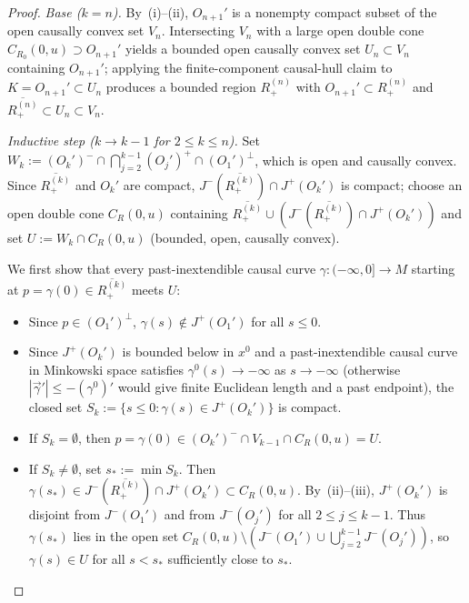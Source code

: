 \documentclass[11pt,a4paper]{article}
\theoremstyle{definition}
\theoremstyle{remark}
\begin{document}
\begin{proof}
\emph{Base ($k=n$).} By~(i)--(ii), $O_{n+1}'$ is a nonempty compact subset of the open causally convex set $V_n$. Intersecting $V_n$ with a large open double cone $C_{R_0}(0,u)\supset O_{n+1}'$ yields a bounded open causally convex set $U_n\subset V_n$ containing $O_{n+1}'$; applying the finite-component causal-hull claim to $K=O_{n+1}'\subset U_n$ produces a bounded region $R_+^{(n)}$ with $O_{n+1}'\subset R_+^{(n)}$ and $\overline{R_+^{(n)}}\subset U_n\subset V_n$.

\emph{Inductive step ($k\to k-1$ for $2\le k\le n$).} Set $W_k := (O_k')^-\cap \bigcap_{j=2}^{k-1}(O_j')^+\cap (O_1')^\perp$, which is open and causally convex. Since $\overline{R_+^{(k)}}$ and $O_k'$ are compact, $J^-(\overline{R_+^{(k)}})\cap J^+(O_k')$ is compact; choose an open double cone $C_R(0,u)$ containing $\overline{R_+^{(k)}}\cup (J^-(\overline{R_+^{(k)}})\cap J^+(O_k'))$ and set $U := W_k\cap C_R(0,u)$ (bounded, open, causally convex).

We first show that every past-inextendible causal curve $\gamma:(-\infty,0]\to M$ starting at $p=\gamma(0)\in\overline{R_+^{(k)}}$ meets $U$:
\begin{itemize}[leftmargin=*,nosep]
\item Since $p\in(O_1')^\perp$, $\gamma(s)\notin J^+(O_1')$ for all $s\le 0$.
\item Since $J^+(O_k')$ is bounded below in $x^0$ and a past-inextendible causal curve in Minkowski space satisfies $\gamma^0(s)\to -\infty$ as $s\to -\infty$ (otherwise $|\vec{\gamma}'|\le -(\gamma^0)'$ would give finite Euclidean length and a past endpoint), the closed set $S_k := \{s\le 0 : \gamma(s)\in J^+(O_k')\}$ is compact.
\item If $S_k=\emptyset$, then $p = \gamma(0)\in (O_k')^-\cap V_{k-1}\cap C_R(0,u) = U$.
\item If $S_k\neq\emptyset$, set $s_* := \min S_k$. Then $\gamma(s_*)\in J^-(\overline{R_+^{(k)}})\cap J^+(O_k')\subset C_R(0,u)$. By~(ii)--(iii), $J^+(O_k')$ is disjoint from $J^-(O_1')$ and from $J^-(O_j')$ for all $2\le j\le k-1$. Thus $\gamma(s_*)$ lies in the open set $C_R(0,u)\setminus(J^-(O_1')\cup\bigcup_{j=2}^{k-1}J^-(O_j'))$, so $\gamma(s)\in U$ for all $s < s_*$ sufficiently close to $s_*$.
\end{itemize}


\end{proof}
\end{document}
